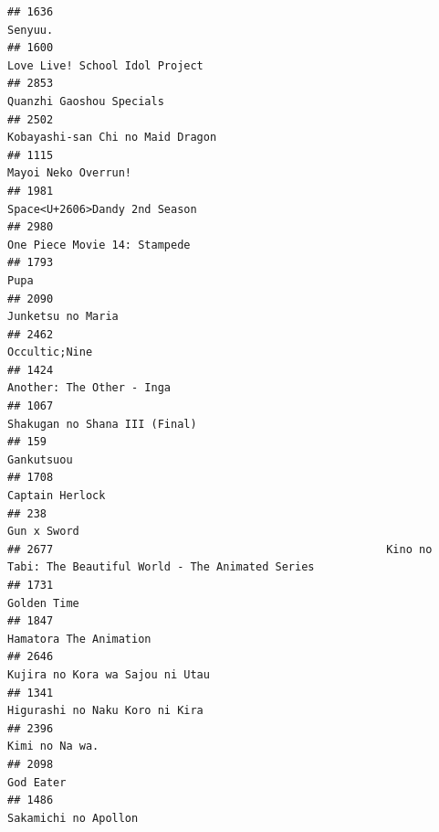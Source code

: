 \documentclass[
]{article}
\begin{document}
\begin{verbatim}
## 1636                                                                                                   Senyuu.
## 1600                                                                            Love Live! School Idol Project
## 2853                                                                                  Quanzhi Gaoshou Specials
## 2502                                                                          Kobayashi-san Chi no Maid Dragon
## 1115                                                                                       Mayoi Neko Overrun!
## 1981                                                                             Space<U+2606>Dandy 2nd Season
## 2980                                                                              One Piece Movie 14: Stampede
## 1793                                                                                                      Pupa
## 2090                                                                                         Junketsu no Maria
## 2462                                                                                             Occultic;Nine
## 1424                                                                                 Another: The Other - Inga
## 1067                                                                             Shakugan no Shana III (Final)
## 159                                                                                                 Gankutsuou
## 1708                                                                                           Captain Herlock
## 238                                                                                                Gun x Sword
## 2677                                                   Kino no Tabi: The Beautiful World - The Animated Series
## 1731                                                                                               Golden Time
## 1847                                                                                    Hamatora The Animation
## 2646                                                                           Kujira no Kora wa Sajou ni Utau
## 1341                                                                            Higurashi no Naku Koro ni Kira
## 2396                                                                                            Kimi no Na wa.
## 2098                                                                                                 God Eater
## 1486                                                                                      Sakamichi no Apollon

\end{verbatim}
\end{document}
